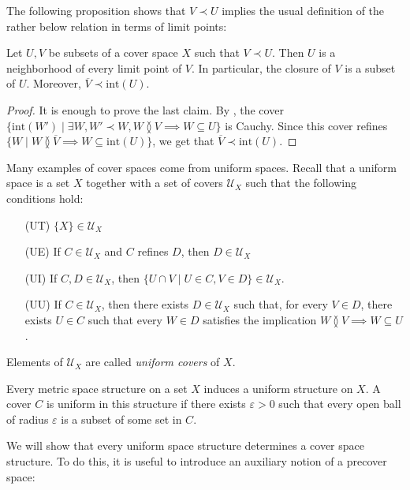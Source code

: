 \documentclass[reqno]{amsart}
\newcommand{\axitem}[1]{\phantomsection \label{ax:#1}}
\theoremstyle{definition}
\theoremstyle{remark}
\numberwithin{figure}{section}
\newcommand{\overlap}[2]{#1 \between #2}
\newcommand{\rb}{\prec}
\begin{document}
The following proposition shows that $V \rb U$ implies the usual definition of the rather below relation in terms of limit points:

\begin{prop}[rb-closure]
Let $U,V$ be subsets of a cover space $X$ such that $V \rb U$.
Then $U$ is a neighborhood of every limit point of $V$.
In particular, the closure of $V$ is a subset of $U$.
Moreover, $\overline{V} \rb \mathrm{int}(U)$.
\end{prop}
\begin{proof}
It is enough to prove the last claim.
By , the cover $\{ \mathrm{int}(W') \mid \exists W, W' \rb W, \overlap{W}{V} \implies W \subseteq U \}$ is Cauchy.
Since this cover refines $\{ W \mid \overlap{W}{\overline{V}} \implies W \subseteq \mathrm{int}(U) \}$, we get that $\overline{V} \rb \mathrm{int}(U)$.
\end{proof}

Many examples of cover spaces come from uniform spaces.
Recall that a uniform space is a set $X$ together with a set of covers $\mathcal{U}_X$ such that the following conditions hold:
\begin{itemize}
\item[(UT)] $\{ X \} \in \mathcal{U}_X$
\item[(UE)] \axitem{UE} If $C \in \mathcal{U}_X$ and $C$ refines $D$, then $D \in \mathcal{U}_X$
\item[(UI)] \axitem{UI} If $C,D \in \mathcal{U}_X$, then $\{ U \cap V \mid U \in C, V \in D \} \in \mathcal{U}_X$.
\item[(UU)] \axitem{UU} If $C \in \mathcal{U}_X$, then there exists $D \in \mathcal{U}_X$ such that, for every $V \in D$,
there exists $U \in C$ such that every $W \in D$ satisfies the implication $\overlap{W}{V} \implies W \subseteq U$.
\end{itemize}
Elements of $\mathcal{U}_X$ are called \emph{uniform covers} of $X$.

\begin{example}
Every metric space structure on a set $X$ induces a uniform structure on $X$.
A cover $C$ is uniform in this structure if there exists $\varepsilon > 0$ such that every open ball of radius $\varepsilon$ is a subset of some set in $C$.
\end{example}

We will show that every uniform space structure determines a cover space structure.
To do this, it is useful to introduce an auxiliary notion of a precover space:
\end{document}
